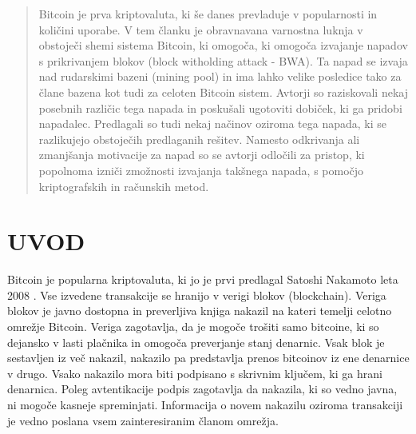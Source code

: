 \documentclass{acm_proc_article-sp}
\begin{document}
	\date{30 July 1999}
	
	\maketitle
\begin{abstract}

Bitcoin je prva kriptovaluta, ki še danes prevladuje v popularnosti in količini uporabe. V tem članku je obravnavana  varnostna luknja v obstoječi shemi sistema Bitcoin, ki omogoča, ki omogoča izvajanje napadov s prikrivanjem blokov (block witholding attack - BWA). Ta napad se izvaja nad rudarskimi bazeni (mining pool) in ima lahko velike posledice tako za člane bazena kot tudi za celoten Bitcoin sistem. Avtorji so raziskovali nekaj posebnih različic tega napada in poskušali ugotoviti dobiček, ki ga pridobi napadalec. Predlagali so tudi nekaj načinov oziroma tega napada, ki se razlikujejo obstoječih predlaganih rešitev.
Namesto odkrivanja ali zmanjšanja motivacije za napad so se avtorji odločili za pristop, ki popolnoma izniči zmožnosti izvajanja takšnega napada, s pomočjo kriptografskih in računskih metod.

\end{abstract}

\section{UVOD} \label{sekcija1}

Bitcoin je popularna kriptovaluta, ki jo je prvi predlagal Satoshi Nakamoto leta 2008 \cite{nakamoto}. Vse izvedene transakcije se hranijo v verigi blokov (blockchain). Veriga blokov je javno dostopna in preverljiva knjiga nakazil na kateri temelji celotno omrežje Bitcoin. Veriga zagotavlja, da je mogoče trošiti samo bitcoine, ki so dejansko v lasti plačnika in omogoča preverjanje stanj denarnic. Vsak blok je sestavljen iz več nakazil, nakazilo pa predstavlja prenos bitcoinov iz ene denarnice v drugo. Vsako nakazilo mora biti podpisano s skrivnim ključem, ki ga hrani denarnica. Poleg avtentikacije podpis zagotavlja da nakazila, ki so vedno javna, ni mogoče kasneje spreminjati. Informacija o novem nakazilu oziroma transakciji je vedno poslana vsem zainteresiranim članom omrežja.
\end{document}
